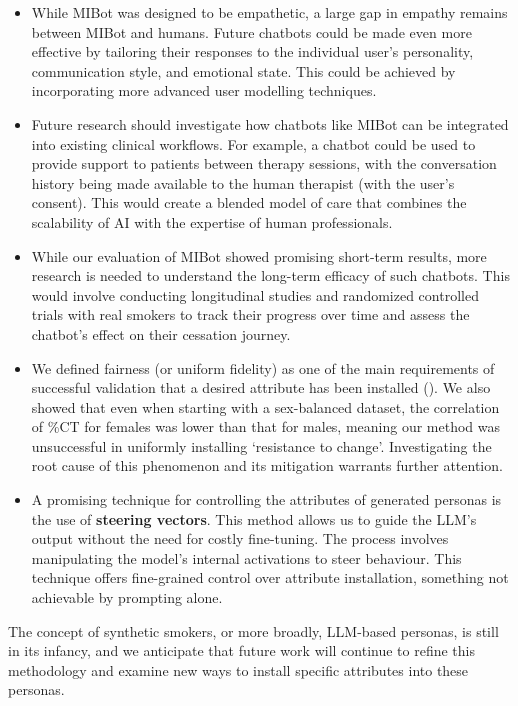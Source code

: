 \begin{itemize}
	\item While MIBot was designed to be empathetic, a large gap in empathy remains between MIBot and humans. Future chatbots could be made even more effective by tailoring their responses to the individual user's personality, communication style, and emotional state. This could be achieved by incorporating more advanced user modelling techniques.
	\item Future research should investigate how chatbots like MIBot can be integrated into existing clinical workflows. For example, a chatbot could be used to provide support to patients between therapy sessions, with the conversation history being made available to the human therapist (with the user's consent). This would create a blended model of care that combines the scalability of AI with the expertise of human professionals.
	\item While our evaluation of MIBot showed promising short-term results, more research is needed to understand the long-term efficacy of such chatbots. This would involve conducting longitudinal studies and randomized controlled trials with real smokers to track their progress over time and assess the chatbot's effect on their cessation journey.
	\item  We defined fairness (or uniform fidelity) as one of the main requirements of successful validation that a desired attribute has been installed (). We also showed that even when starting with a sex-balanced dataset, the correlation of \%CT for females was lower than that for males, meaning our method was unsuccessful in uniformly installing `resistance to change'. Investigating the root cause of this phenomenon and its mitigation warrants further attention.
	\item A promising technique for controlling the attributes of generated personas is the use of \textbf{steering vectors}. This method allows us to guide the LLM's output without the need for costly fine-tuning. The process involves manipulating the model's internal activations to steer behaviour. This technique offers fine-grained control over attribute installation, something not achievable by prompting alone.
\end{itemize}

The concept of synthetic smokers, or more broadly, LLM-based personas, is still in its infancy, and we anticipate that future work will continue to refine this methodology and examine new ways to install specific attributes into these personas.

